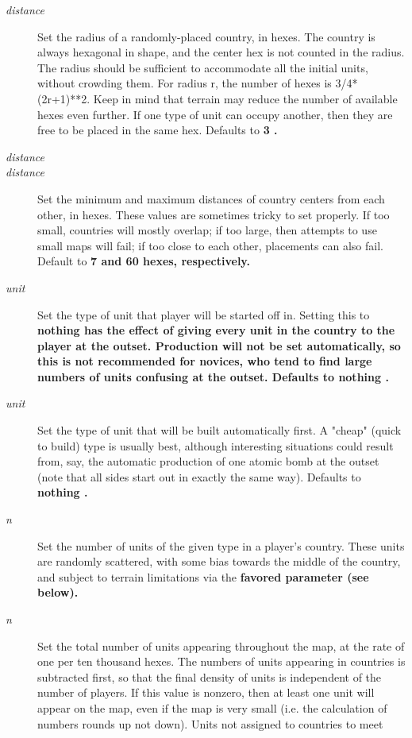 \begin{description}
\item[{%
\it distance}]
Set the radius of a randomly-placed country, in hexes.
The country is always hexagonal in shape, and the center hex is not counted
in the radius.  The radius should be sufficient to accommodate all the
initial units, without crowding them.  For radius r, the number of hexes
is 3/4*(2r+1)**2.  Keep in mind that terrain may reduce
the number of available hexes even further.
If one type of unit can occupy another, then they are free to be placed in
the same hex.
Defaults to %
\bf 3\rm%
.
\item[{%
\it distance}]
\item[{%
\it distance}]
Set the minimum and maximum
distances of country centers from each other, in hexes.
These values are sometimes tricky to set properly.
If too small, countries will mostly overlap;
if too large, then attempts to use
small maps will fail; if too close to each other, placements can also fail.
Default to %
\bf 7 \rm%
and %
\bf 60 \rm%
hexes, respectively.
\item[{%
\it unit}]
Set the type of unit that player will be started off in.
Setting this to %
\bf nothing \rm%
has the effect of giving every unit in
the country to the player at the outset.  Production will not be
set automatically, so this is not recommended for novices, who tend
to find large numbers of units confusing at the outset.
Defaults to %
\bf nothing\rm%
.
\item[{%
\it unit}]
Set the type of unit that will be built automatically first.
A "cheap" (quick to build) type is usually best,
although interesting situations could result from, say, the
automatic production of one atomic bomb at the outset (note that all sides
start out in exactly the same way).
Defaults to %
\bf nothing\rm%
.
\item[{%
\it n}]
Set the number of units of the given type in a player's country.  These
units are randomly scattered, with some bias towards the middle of the
country, and subject to terrain limitations via the %
\bf favored \rm%
parameter
(see below).
\item[{%
\it n}]
Set the total number of units appearing throughout the map, at the rate
of one per ten thousand hexes.  The numbers of units appearing in countries
is subtracted first,
so that the final density of units is independent of the
number of players.  If this value is nonzero, then at least one unit will
appear on the map, even if the map is very small (i.e. the calculation of
numbers rounds up not down).  Units not assigned to countries to meet 

\end{description}
